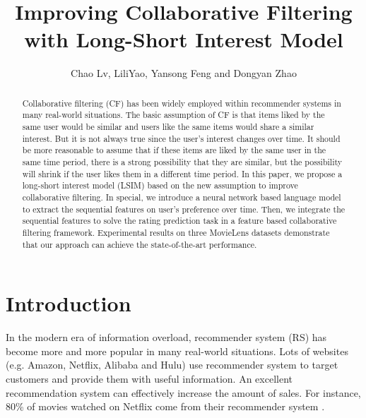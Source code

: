 \documentclass{llncs}
\begin{document}
%
\title{Improving Collaborative Filtering with Long-Short Interest Model}
%
\author{
	Chao Lv, LiliYao, Yansong Feng\inst{*} and Dongyan Zhao
}
%
%
\maketitle
%
\begin{abstract}
Collaborative filtering (CF) has been widely employed within
recommender systems in many real-world situations.
The basic assumption of CF is that items liked by the same user would be similar and
users like the same items would share a similar interest.
But it is not always true since the user's interest changes over time.
It should be more reasonable to assume that
if these items are liked by the same user in the same time period,
there is a strong possibility that they are similar,
but the possibility will shrink if the user likes them in a different time period.
In this paper, we propose a long-short interest model (LSIM) based on
the new assumption to improve collaborative filtering.
In special, we introduce a neural network based language model
to extract the sequential features on user's preference over time.
Then, we integrate the sequential features to solve the rating prediction task
in a feature based collaborative filtering framework.
Experimental results on three MovieLens datasets demonstrate that
our approach can achieve the state-of-the-art performance.
\end{abstract}
%
\section{Introduction}
In the modern era of information overload,
recommender system (RS) has become more and more popular in many real-world situations.
Lots of websites (e.g. Amazon, Netflix, Alibaba and Hulu) use recommender system to
target customers and provide them with useful information.
An excellent recommendation system can effectively increase the amount of sales.
For instance, 80\% of movies watched on Netflix
come from their recommender system \cite{gomez2015netflix}.
\end{document}
